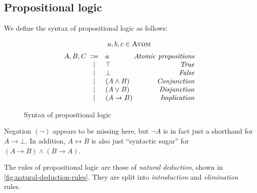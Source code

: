 \subsection{Propositional logic}
We define the syntax of propositional logic as follows:
\begin{figure}[htbp]
    \[
    \begin{array}{r@{\hspace{.5em}}cl@{\hspace{.2em}}r}
        \multicolumn{4}{c}{a,b,c \in \textsc{Atom}}\\[2mm]
        A, B, C & \Coloneqq & a & \emph{Atomic propositions} \\
        & | & \top & \emph{True} \\
        & | & \bot & \emph{False} \\
        & | & (A \land B) & \emph{Conjunction} \\
        & | & (A \lor B) & \emph{Disjunction} \\
        & | & (A \to B) & \emph{Implication} \\
    \end{array}
    \]
    \caption{Syntax of propositional logic}
    \label{fig:prop-logic-grammar}
\end{figure}

Negation $(\neg)$ appears to be missing here, but $\neg A$ is in fact just a shorthand for $A \to \bot$.
In addition, $A \leftrightarrow B$ is also just ``syntactic sugar'' for $(A \to B) \land (B \to A)$.

The rules of propositional logic are those of \emph{natural deduction}, shown in \cref{fig:natural-deduction-rules}.
They are split into \emph{introduction} and \emph{elimination} rules.

